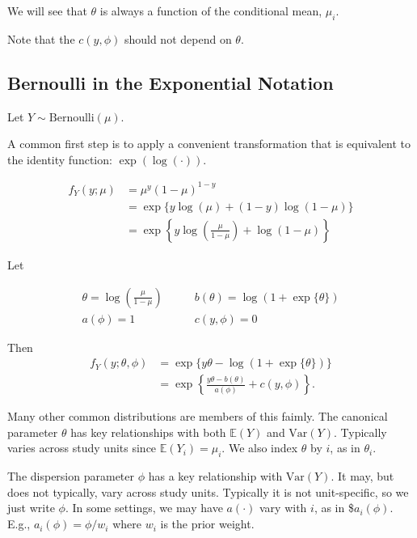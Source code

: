 \documentclass[
  letterpaper,
  DIV=11,
  numbers=noendperiod]{scrreport}
\begin{document}
We will see that \(\theta\) is always a function of the conditional
mean, \(\mu_i\).

Note that the \(c(y, \phi)\) should not depend on \(\theta\).

\hypertarget{bernoulli-in-the-exponential-notation}{%
\subsection{Bernoulli in the Exponential
Notation}\label{bernoulli-in-the-exponential-notation}}

Let \(Y \sim \text{Bernoulli}(\mu)\).

A common first step is to apply a convenient transformation that is
equivalent to the identity function: \(\exp(\log(\cdot))\).

\[
\begin{aligned}
f_Y(y ; \mu ) & = \mu^y (1- \mu)^{1-y} \\ 
& = \exp \{ y \log(\mu) + (1-y) \log (1-\mu) \} \\ 
& = \exp \left\{ y \log \left( \frac{\mu}{1-\mu} \right)  + \log(1-\mu) \right\}
\end{aligned}
\]

Let

\[
\begin{aligned}
\theta = \log\left( \frac{\mu}{1-\mu} \right) \quad \quad & b(\theta) = \log (1 + \exp \{ \theta \}) \\ 
a(\phi) = 1 \quad \quad & c(y, \phi) = 0
\end{aligned}
\]

Then \[
\begin{aligned}
f_Y(y; \theta, \phi) & = \exp \{ y \theta - \log (1 + \exp \{ \theta \} ) \} \\ 
& = \exp \left\{ \frac{y \theta - b(\theta) }{a(\phi)} + c(y, \phi) \right\}.
\end{aligned}
\]

Many other common distributions are members of this faimly. The
canonical parameter \(\theta\) has key relationships with both
\(\mathbb E(Y)\) and \(\text{Var}(Y)\). Typically varies across study
units since \(\mathbb E(Y_i) = \mu_i\). We also index \(\theta\) by
\(i\), as in \(\theta_i\).

The dispersion parameter \(\phi\) has a key relationship with
\(\text{Var}(Y)\). It may, but does not typically, vary across study
units. Typically it is not unit-specific, so we just write \(\phi\). In
some settings, we may have \(a(\cdot)\) vary with \(i\), as in
\$\(a_i(\phi)\). E.g., \(a_i(\phi) = \phi / w_i\) where \(w_i\) is the
prior weight.
\end{document}
